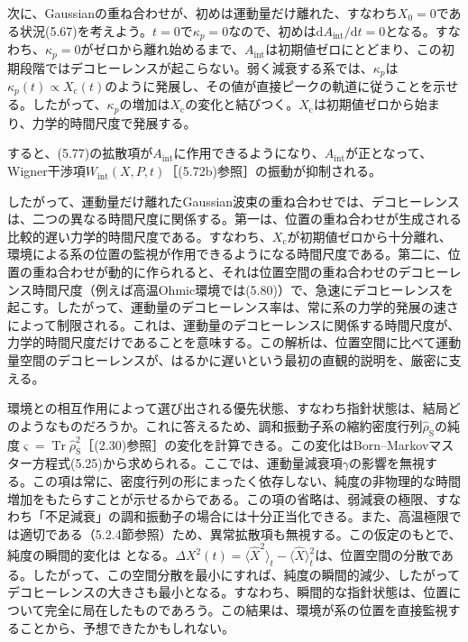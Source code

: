 次に、Gaussianの重ね合わせが、初めは運動量だけ離れた、すなわち$X_0=0$である状況(5.67)を考えよう。$t=0$で$\kappa_p=0$なので、初めは$\mathrm dA_{\mathrm{int}}/\mathrm dt=0$となる。すなわち、$\kappa_p=0$がゼロから離れ始めるまで、$A_{\mathrm{int}}$は初期値ゼロにとどまり、この初期段階ではデコヒーレンスが起こらない。弱く減衰する系では、$\kappa_p$は$\kappa_p(t)\propto X_{\mathrm c}(t)$のように発展し、その値が直接ピークの軌道に従うことを示せる\cite{ref184}。したがって、$\kappa_p$の増加は$X_{\mathrm c}$の変化と結びつく。$X_{\mathrm c}$は初期値ゼロから始まり、力学的時間尺度で発展する。

\hypertarget{srcpage:201}{}\label{srcpage:201}
すると、(5.77)の拡散項が$A_{\mathrm{int}}$に作用できるようになり、$A_{\mathrm{int}}$が正となって、Wigner干渉項$W_{\mathrm{int}}(X,P,t)$［(5.72b)参照］の振動が抑制される。

したがって、運動量だけ離れたGaussian波束の重ね合わせでは、デコヒーレンスは、二つの異なる時間尺度に関係する。第一は、位置の重ね合わせが生成される比較的遅い力学的時間尺度である。すなわち、$X_{\mathrm c}$が初期値ゼロから十分離れ、環境による系の位置の監視が作用できるようになる時間尺度である。第二に、位置の重ね合わせが動的に作られると、それは位置空間の重ね合わせのデコヒーレンス時間尺度（例えば高温Ohmic環境では(5.80)）で、急速にデコヒーレンスを起こす。したがって、運動量のデコヒーレンス率は、常に系の力学的発展の速さによって制限される。これは、運動量のデコヒーレンスに関係する時間尺度が、力学的時間尺度だけであることを意味する。この解析は、位置空間に比べて運動量空間のデコヒーレンスが、はるかに遅いという最初の直観的説明を、厳密に支える。

環境との相互作用によって選び出される優先状態、すなわち指針状態は、結局どのようなものだろうか。これに答えるため、調和振動子系の縮約密度行列$\hat\rho_{\mathrm S}$の純度$\varsigma=\operatorname{Tr}\hat\rho_{\mathrm S}^2$［(2.30)参照］の変化を計算できる。この変化はBorn--Markovマスター方程式(5.25)から求められる。ここでは、運動量減衰項$\gamma$の影響を無視する。この項は常に、密度行列の形にまったく依存しない、純度の非物理的な時間増加をもたらすことが示せるからである\cite{ref016}。この項の省略は、弱減衰の極限、すなわち「不足減衰」の調和振動子の場合には十分正当化できる。また、高温極限では適切である（5.2.4節参照）ため、異常拡散項も無視する。この仮定のもとで、純度の瞬間的変化は\cite{ref086}
となる。$\Delta X^2(t)=\langle\hat X^2\rangle_t-\langle\hat X\rangle_t^2$は、位置空間の分散である。したがって、この空間分散を最小にすれば、純度の瞬間的減少、したがってデコヒーレンスの大きさも最小となる。すなわち、瞬間的な指針状態は、位置について完全に局在したものであろう。この結果は、環境が系の位置を直接監視することから、予想できたかもしれない。

